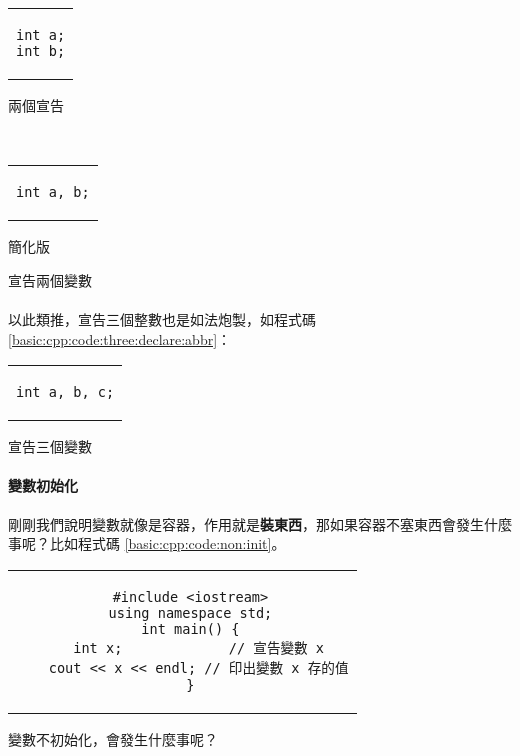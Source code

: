\documentclass[12pt,a4paper,oneside]{article}
\begin{document}
\begin{CJK}{UTF8}{bkai}
\begin{code}[h!]
  \centering
  \begin{subcode}{.33\textwidth}
    \centering
    \begin{tabular}{c}
    \begin{lstlisting}
int a;
int b;
    \end{lstlisting}
    \end{tabular}
    \caption{兩個宣告}
    \label{basic:cpp:code:two:declare}
  \end{subcode}
  ~
  \begin{subcode}{.33\textwidth}
    \centering
    \begin{tabular}{c}
    \begin{lstlisting}
int a, b;
    \end{lstlisting}
    \end{tabular}
    \caption{簡化版}
    \label{basic:cpp:code:two:declare:abbr}
  \end{subcode}
  \caption{宣告兩個變數}
  \label{basic:cpp:code:two:declare:total}
\end{code}

\paragraph{}以此類推，宣告三個整數也是如法炮製，如程式碼 \ref{basic:cpp:code:three:declare:abbr}：
\begin{code}[h!]
\centering
\begin{tabular}{c}
\begin{lstlisting}
int a, b, c;
\end{lstlisting}
\end{tabular}
\caption{宣告三個變數}
\label{basic:cpp:code:three:declare:abbr}
\end{code}

\paragraph{變數初始化}剛剛我們說明變數就像是容器，作用就是\textbf{裝東西}，那如果容器不塞東西會發生什麼事呢？比如程式碼 \ref{basic:cpp:code:non:init}。

\begin{code}[h!]
\centering
\begin{tabular}{c}
\begin{lstlisting}
  #include <iostream>
  using namespace std;
  int main() {
    int x;             // 宣告變數 x
    cout << x << endl; // 印出變數 x 存的值
  }
\end{lstlisting}
\end{tabular}
\caption{變數不初始化，會發生什麼事呢？}
\label{basic:cpp:code:non:init}
\end{code}


\end{CJK}
\end{document}
